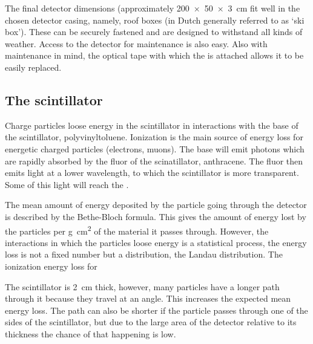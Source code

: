 The final detector dimensions (approximately \SI[product-units=power]{200 x 50 x 3}{\centi\meter} fit well in the chosen detector casing, namely, roof boxes (in Dutch generally referred to as `ski box'). These can be securely fastened and are designed to withstand all kinds of weather. Access to the detector for maintenance is also easy. Also with maintenance in mind, the optical tape with which the \pmt is attached allows it to be easily replaced.


\subsection{The scintillator}

Charge particles loose energy in the scintillator in interactions with the base of the scintillator, polyvinyltoluene. Ionization is the main source of energy loss for energetic charged particles (electrons, muons). The base will emit photons which are rapidly absorbed by the fluor of the scinatillator, anthracene. The fluor then emits light at a lower wavelength, to which the scintillator is more transparent. Some of this light will reach the \pmt.

The mean amount of energy deposited by the particle going through the detector is described by the Bethe-Bloch formula. This gives the amount of energy lost by the particles per \si{\gram\centi\meter\squared} of the material it passes through. However, the interactions in which the particles loose energy is a statistical process, the energy loss is not a fixed number but a distribution, the Landau distribution. The ionization energy loss for

The scintillator is \SI{2}{\centi\meter} thick, however, many particles have a longer path through it because they travel at an angle. This increases the expected mean energy loss. The path can also be shorter if the particle passes through one of the sides of the scintillator, but due to the large area of the detector relative to its thickness the chance of that happening is low.

